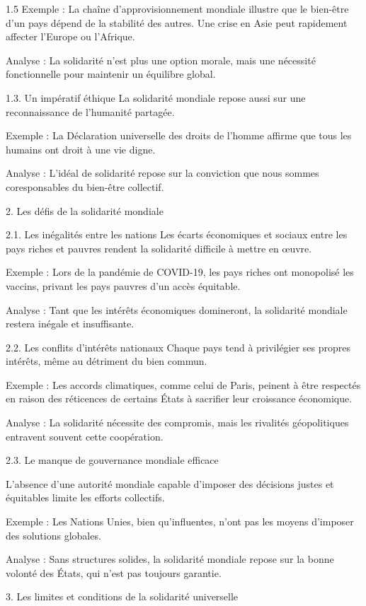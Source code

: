 \documentclass[12pt]{article}
\begin{document}
\begin{spacing}{1.5}
Exemple : La chaîne d'approvisionnement mondiale illustre que le bien-être d'un pays dépend de la stabilité des autres. Une crise en Asie peut rapidement affecter l'Europe ou l'Afrique.

Analyse : La solidarité n'est plus une option morale, mais une nécessité fonctionnelle pour maintenir un équilibre global.

1.3. Un impératif éthique
La solidarité mondiale repose aussi sur une reconnaissance de l'humanité partagée.

Exemple : La Déclaration universelle des droits de l'homme affirme que tous les humains ont droit à une vie digne.

Analyse : L'idéal de solidarité repose sur la conviction que nous sommes coresponsables du bien-être collectif.

2. Les défis de la solidarité mondiale

2.1. Les inégalités entre les nations
Les écarts économiques et sociaux entre les pays riches et pauvres rendent la solidarité difficile à mettre en œuvre.

Exemple : Lors de la pandémie de COVID-19, les pays riches ont monopolisé les vaccins, privant les pays pauvres d'un accès équitable.

Analyse : Tant que les intérêts économiques domineront, la solidarité mondiale restera inégale et insuffisante.

2.2. Les conflits d'intérêts nationaux
Chaque pays tend à privilégier ses propres intérêts, même au détriment du bien commun.

Exemple : Les accords climatiques, comme celui de Paris, peinent à être respectés en raison des réticences de certains États à sacrifier leur croissance économique.

Analyse : La solidarité nécessite des compromis, mais les rivalités géopolitiques entravent souvent cette coopération.

2.3. Le manque de gouvernance mondiale efficace

L'absence d'une autorité mondiale capable d'imposer des décisions justes et équitables limite les efforts collectifs.

Exemple : Les Nations Unies, bien qu'influentes, n'ont pas les moyens d'imposer des solutions globales.

Analyse : Sans structures solides, la solidarité mondiale repose sur la bonne volonté des États, qui n'est pas toujours garantie.

3. Les limites et conditions de la solidarité universelle


\end{spacing}
\end{document}
